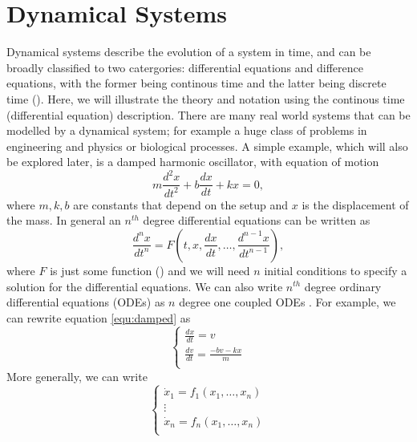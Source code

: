 \documentclass{statsmsc}
\begin{document}
\section{Dynamical Systems}
Dynamical systems describe the evolution of a system in time, and can be broadly classified to two catergories: differential equations and difference equations, with the former being continous time and the latter being discrete time (\cite{strogatz_2019}). 
Here, we will illustrate the theory and notation using the continous time (differential equation) description.
There are many real world systems that can be modelled by a dynamical system; for example a huge class of problems in engineering and physics or biological processes. 
A simple example, which will also be explored later, is a damped harmonic oscillator, with equation of motion
\begin{equation}
m\frac{d^2x}{dt^2}+b\frac{dx}{dt}+kx=0,
\label{equ:damped}
\end{equation}
where $m, k, b$ are constants that depend on the setup and $x$ is the displacement of the mass.
In general an $n^{th}$ degree differential equations can be written as 
$$
\frac{d^{n} x}{d t^{n}}=F\left(t, x, \frac{d x}{d t}, \ldots, \frac{d^{n-1} x}{d t^{n-1}}\right),
$$
where $F$ is just some function (\cite{glendinning_1994}) and we will need $n$ initial conditions to specify a solution for the differential equations.
We can also write $n^{th}$ degree ordinary differential equations (ODEs) as $n$ degree one coupled ODEs \citep{strogatz_2019}. 
For example, we can rewrite equation \ref{equ:damped} as 
$$
\begin{cases}
  \frac{dx}{dt} = v\\
  \frac{dv}{dt} = \frac{-bv-kx}{m}\\
\end{cases}
$$
More generally, we can write 
$$
\begin{cases}
  \dot{x}_1=f_1(x_1, \dots, x_n)\\ 
  \vdots\\
  \dot{x}_n=f_n(x_1, \dots, x_n)\\ 
\end{cases}
$$
\end{document}

